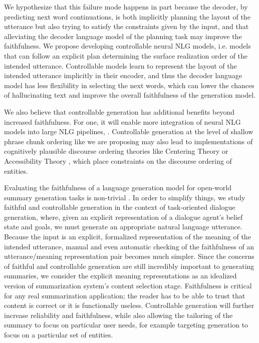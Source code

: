 We hypothesize that this failure mode happens in part because the decoder, by
predicting next word continuations, is both implicitly planning the layout of
the utterance but also trying to satisfy the constraints given by the input,
and that alleviating the decoder language model of the planning task may
improve the faithfulness.  We propose developing controllable neural NLG
models, i.e. models that can follow an explicit plan determining  the surface
realization order of the intended utterance.  Controllable models learn to
represent the layout of the intended utterance implicitly in their encoder,
and thus the decoder language model has less flexibility in selecting the next
words, which can lower the chances of hallucinating text and improve the
overall faithfulness of the generation model.

We also believe that controllable generation has additional benefits beyond
increased faithfulness. For one, it will enable more integration of neural NLG
models into large NLG pipelines, \citep{castroferreira2019}.  Controllable
generation at the level of shallow phrase chunk ordering like we are proposing
may also lead to implementations of cognitively plausible discourse ordering
theories like Centering Theory \citep{grosz1995} or Accessibility Theory
\citep{ariel2001}, which place constraints on the discourse ordering of
entities.

Evaluating the faithfulness of a language generation model for open-world
summary generation tasks is non-trivial \citep{kryscinski2020,maynez2020}. In
order to simplify things, we study faithful and controllable generation in the
context of task-oriented dialogue generation, where, given an explicit
representation of a dialogue agent's belief state and goals, we must generate
an appropriate natural language utterance. Because the input is an explicit,
formalized representation of the meaning of the intended utterance, manual and
even automatic checking of the faithfulness of an utterance/meaning
representation pair becomes much simpler. Since the concerns of faithful and
controllable generation are still incredibly important to generating
summaries, we consider the explicit meaning representations as an idealized
version of summarization system's content selection stage.  Faithfulness is
critical for any real summarization application; the reader has to be able to
trust that content is correct or it is functionally useless. Controllable
generation will further increase reliability and faithfulness, while also
allowing the tailoring of the summary to focus on particular user needs, for
example targeting generation to focus on a particular set of entities. 
      
